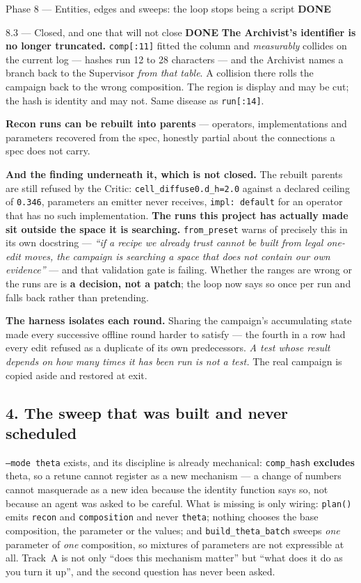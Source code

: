\documentclass[11pt,a4paper]{article}
\newcommand{\code}[1]{\texttt{#1}}
\newcommand{\done}{\textcolor{good}{\textbf{DONE}}}
\begin{document}
\begin{phasebox}{Phase 8 --- Entities, edges and sweeps: the loop stops being a script \hfill \done}
\begin{resultbox}{8.3 --- Closed, and one that will not close \hfill \done}
\smallskip
\textbf{The Archivist's identifier is no longer truncated.} \code{comp[:11]} fitted the column and
\emph{measurably} collides on the current log --- hashes run 12 to 28 characters --- and the
Archivist names a branch back to the Supervisor \emph{from that table}. A collision there rolls the
campaign back to the wrong composition. The region is display and may be cut; the hash is identity
and may not. Same disease as \code{run[:14]}.

\smallskip
\textbf{Recon runs can be rebuilt into parents} --- operators, implementations and parameters
recovered from the spec, honestly partial about the connections a spec does not carry.

\smallskip
\textbf{And the finding underneath it, which is not closed.} The rebuilt parents are still refused
by the Critic: \code{cell\_diffuse0.d\_h=2.0} against a declared ceiling of \code{0.346},
parameters an emitter never receives, \code{impl: default} for an operator that has no such
implementation. \textbf{The runs this project has actually made sit outside the space it is
searching.} \code{from\_preset} warns of precisely this in its own docstring --- \emph{``if a recipe
we already trust cannot be built from legal one-edit moves, the campaign is searching a space that
does not contain our own evidence''} --- and that validation gate is failing. Whether the ranges are
wrong or the runs are is \textbf{a decision, not a patch}; the loop now says so once per run and
falls back rather than pretending.

\smallskip
\textbf{The harness isolates each round.} Sharing the campaign's accumulating state made every
successive offline round harder to satisfy --- the fourth in a row had every edit refused as a
duplicate of its own predecessors. \emph{A test whose result depends on how many times it has been
run is not a test.} The real campaign is copied aside and restored at exit.
\end{resultbox}

\subsection*{4. The sweep that was built and never scheduled}
\code{--mode theta} exists, and its discipline is already mechanical: \code{comp\_hash}
\textbf{excludes} theta, so a retune cannot register as a new mechanism --- a change of numbers
cannot masquerade as a new idea because the identity function says so, not because an agent was
asked to be careful. What is missing is only wiring: \code{plan()} emits
\code{recon} and \code{composition} and never \code{theta}; nothing chooses the base composition,
the parameter or the values; and \code{build\_theta\_batch} sweeps \emph{one} parameter of
\emph{one} composition, so mixtures of parameters are not expressible at all. Track~A is not only
``does this mechanism matter'' but ``what does it do as you turn it up'', and the second question
has never been asked.


\end{phasebox}
\end{document}
